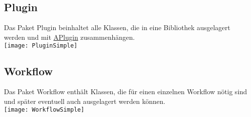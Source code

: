 \subsection{Plugin}
Das Paket Plugin beinhaltet alle Klassen, die in eine Bibliothek ausgelagert werden und mit \hyperref[Workflow:APlugin]{APlugin} zusammenhängen.
\\\texttt{[image: PluginSimple]}
\subsection{Workflow}
Das Paket Workflow enthält Klassen, die für einen einzelnen Workflow nötig sind und später eventuell auch ausgelagert werden können.
\\\texttt{[image: WorkflowSimple]}
